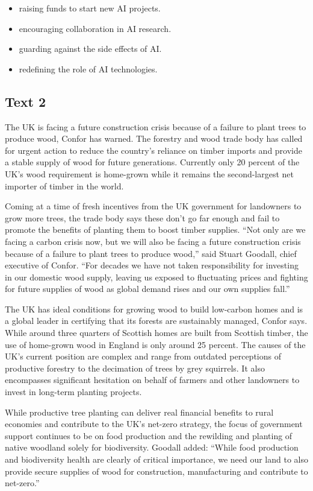 \documentclass[UTF8,11pt]{ctexart}
\begin{document}
\begin{itemize}[leftmargin=2em,itemsep=.2em,topsep=.4em]\item[A.] raising funds to start new AI projects.
\item[B.] encouraging collaboration in AI research.
\item[C.] guarding against the side effects of AI.
\item[D.] redefining the role of AI technologies.
\end{itemize}

\subsection*{\textbf{Text 2}}


The UK is facing a future construction crisis because of a failure to plant trees to produce wood, Confor has warned. The forestry and wood trade body has called for urgent action to reduce the country’s reliance on timber imports and provide a stable supply of wood for future generations. Currently only 20 percent of the UK’s wood requirement is home-grown while it remains the second-largest net importer of timber in the world.


Coming at a time of fresh incentives from the UK government for landowners to grow more trees, the trade body says these don’t go far enough and fail to promote the benefits of planting them to boost timber supplies. “Not only are we facing a carbon crisis now, but we will also be facing a future construction crisis because of a failure to plant trees to produce wood,” said Stuart Goodall, chief executive of Confor. “For decades we have not taken responsibility for investing in our domestic wood supply, leaving us exposed to fluctuating prices and fighting for future supplies of wood as global demand rises and our own supplies fall.”


The UK has ideal conditions for growing wood to build low-carbon homes and is a global leader in certifying that its forests are sustainably managed, Confor says. While around three quarters of Scottish homes are built from Scottish timber, the use of home-grown wood in England is only around 25 percent. The causes of the UK’s current position are complex and range from outdated perceptions of productive forestry to the decimation of trees by grey squirrels. It also encompasses significant hesitation on behalf of farmers and other landowners to invest in long-term planting projects.


While productive tree planting can deliver real financial benefits to rural economies and contribute to the UK’s net-zero strategy, the focus of government support continues to be on food production and the rewilding and planting of native woodland solely for biodiversity. Goodall added: “While food production and biodiversity health are clearly of critical importance, we need our land to also provide secure supplies of wood for construction, manufacturing and contribute to net-zero.”
\end{document}
